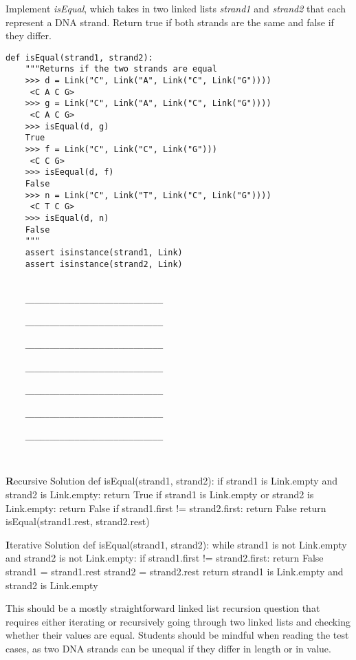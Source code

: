 
\begin{blocksection}
    \question Implement \textit{isEqual}, which takes in two linked lists \textit{strand1} and \textit{strand2} that each represent a DNA strand. Return true if both strands are the same and false if they differ.
    
    \begin{lstlisting}
def isEqual(strand1, strand2):
    """Returns if the two strands are equal 
    >>> d = Link("C", Link("A", Link("C", Link("G")))) 
   	 <C A C G>
    >>> g = Link("C", Link("A", Link("C", Link("G")))) 
     <C A C G>
    >>> isEqual(d, g)
    True
    >>> f = Link("C", Link("C", Link("G")))
     <C C G>
    >>> isEequal(d, f)
    False
    >>> n = Link("C", Link("T", Link("C", Link("G")))) 
     <C T C G>
    >>> isEqual(d, n)
    False
    """
    assert isinstance(strand1, Link)
    assert isinstance(strand2, Link)
    

	____________________________

	____________________________

	____________________________

	____________________________

	____________________________

	____________________________

	____________________________

 
    \end{lstlisting}
    
    \begin{solution}
        \textbf Recursive Solution
        def isEqual(strand1, strand2):
            if strand1 is Link.empty and strand2 is Link.empty:
                return True
            if strand1 is Link.empty or strand2 is Link.empty:
                return False
            if strand1.first != strand2.first:
                return False
            return isEqual(strand1.rest, strand2.rest)

        \textbf Iterative Solution
        def isEqual(strand1, strand2):
            while strand1 is not Link.empty and strand2 is not Link.empty:
                if strand1.first != strand2.first:
                    return False
                strand1 = strand1.rest
                strand2 = strand2.rest
            return strand1 is Link.empty and strand2 is Link.empty
    \end{solution}
\end{blocksection}

\begin{questionmeta}
    This should be a mostly straightforward linked list recursion question that requires either iterating or recursively going through two linked lists and checking whether their values are equal. Students should be mindful when reading the test cases, as two DNA strands can be unequal if they differ in length or in value.
\end{questionmeta}
